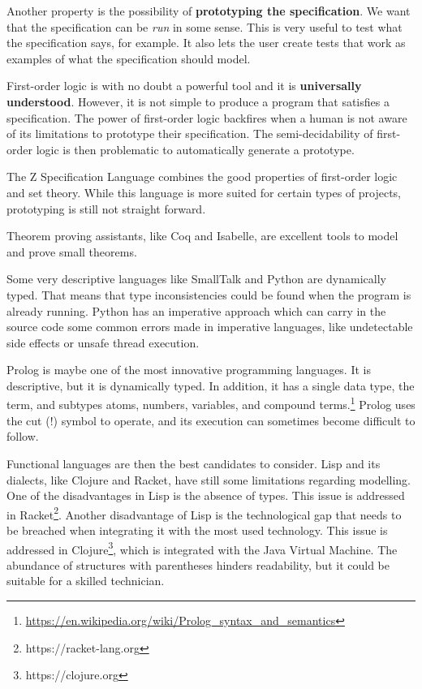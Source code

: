 Another property is the possibility of \textbf{prototyping the specification}.
We want that the specification can be \textit{run} in some sense.
This is very useful to test what the specification says, for example.
It also lets the user create tests that work as examples of what the specification should model.

First-order logic is with no doubt a powerful tool and it is \textbf{universally understood}.
However, it is not simple to produce a program that satisfies a specification.
The power of first-order logic backfires when a human is not aware of its limitations to prototype their specification.
The semi-decidability of first-order logic is then problematic to automatically generate a prototype.

The Z Specification Language combines the good properties of first-order logic and set theory.
While this language is more suited for certain types of projects, prototyping is still not straight forward.

Theorem proving assistants, like Coq and Isabelle, are excellent tools to model and prove small theorems.

Some very descriptive languages like SmallTalk and Python are dynamically typed.
That means that type inconsistencies could be found when the program is already running.
Python has an imperative approach which can carry in the source code some common errors made in imperative languages, like undetectable side effects or unsafe thread execution.

Prolog is maybe one of the most innovative programming languages.
It is descriptive, but it is dynamically typed. In addition, it has a single data type, the term, and subtypes atoms, numbers, variables, and compound terms.\footnote{\url{https://en.wikipedia.org/wiki/Prolog_syntax_and_semantics}}
Prolog uses the cut (!) symbol to operate, and its execution can sometimes become difficult to follow.

Functional languages are then the best candidates to consider.
Lisp and its dialects, like Clojure and Racket, have still some limitations regarding modelling.
One of the disadvantages in Lisp is the absence of types.
This issue is addressed in Racket\footnote{https://racket-lang.org}.
Another disadvantage of Lisp is the technological gap that needs to be breached when integrating it with the most used technology.
This issue is addressed in Clojure\footnote{https://clojure.org}, which is integrated with the Java Virtual Machine.
The abundance of structures with parentheses hinders readability, but it could be suitable for a skilled technician.

